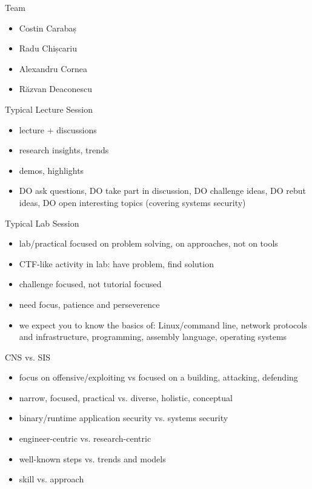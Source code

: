 \documentclass{curs}
\begin{document}
\begin{frame}{Team}
  \begin{itemize}
    \item Costin Carabaș
    \item Radu Chișcariu
    \item Alexandru Cornea
    \item Răzvan Deaconescu
  \end{itemize}
\end{frame}

\begin{frame}{Typical Lecture Session}
  \begin{itemize}
    \pause \item lecture + discussions
    \pause \item research insights, trends
    \pause \item demos, highlights
    \pause \item DO ask questions, DO take part in discussion, DO challenge ideas, DO rebut ideas, DO open interesting topics (covering systems security)
  \end{itemize}
\end{frame}

\begin{frame}{Typical Lab Session}
  \begin{itemize}
    \pause \item lab/practical focused on problem solving, on approaches, not on tools
    \pause \item CTF-like activity in lab: have problem, find solution
    \pause \item challenge focused, not tutorial focused
    \pause \item need focus, patience and perseverence
    \pause \item we expect you to know the basics of: Linux/command line, network protocols and infrastructure, programming, assembly language, operating systems
  \end{itemize}
\end{frame}

\begin{frame}{CNS vs. SIS}
  \begin{itemize}
    \pause \item focus on offensive/exploiting vs focused on a building, attacking, defending
    \pause \item narrow, focused, practical vs. diverse, holistic, conceptual
    \pause \item binary/runtime application security vs. systems security
    \pause \item engineer-centric vs. research-centric
    \pause \item well-known steps vs. trends and models
    \pause \item skill vs. approach
  \end{itemize}
\end{frame}
\end{document}
